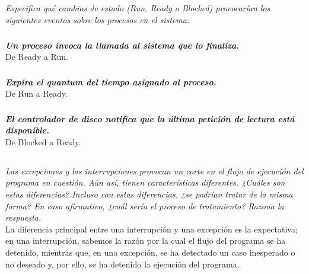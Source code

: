 \documentclass[spanish]{article}
\begin{document}
\newpage

\subsection{}

\textit{Especifica qué cambios de estado (Run, Ready o
Blocked) provocarían los siguientes eventos sobre los
procesos en el sistema:}

\subsubsection{}

\textbf{\textit{Un proceso invoca la llamada al sistema que
lo finaliza.}}\\

De Ready a Run.

\subsubsection{}

\textbf{\textit{Expira el quantum del tiempo asignado al
proceso.}}\\

De Run a Ready.

\subsubsection{}

\textbf{\textit{El controlador de disco notifica que la
última petición de lectura está disponible.}}\\

De Blocked a Ready.

\subsection{}

\textit{Las excepciones y las interrupciones provocan un
corte en el flujo de ejecución del programa en cuestión. Aún
así, tienen características diferentes. ¿Cuáles son estas
diferencias? Incluso con estas diferencias, ¿se podrían
tratar de la misma forma? En caso afirmativo, ¿cuál sería el
proceso de tratamiento? Razona la respuesta.}\\

La diferencia principal entre una interrupción y una
excepción es la expectativa; en una interrupción, sabemos la
razón por la cual el flujo del programa se ha detenido,
mientras que, en una excepción, se ha detectado un caso
inesperado o no deseado y, por ello, se ha detenido la
ejecución del programa.\\
\end{document}
